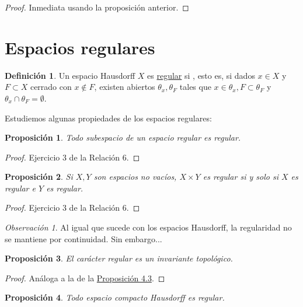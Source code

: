 \documentclass[12pt]{report}
\newtheorem{proposition}{Proposición}[chapter]
\theoremstyle{definition}
\newtheorem{definition}{Definición}[chapter]
\theoremstyle{definition}
\theoremstyle{remark}
\newtheorem*{obs}{Observación} %
\begin{document}
\begin{proof}
Inmediata usando la proposición anterior.
\end{proof}

\section{Espacios regulares}

\begin{definition}
Un espacio Hausdorff $X$ es \underline{regular} si , esto es, si dados $x \in X$ y $F \subset X$ cerrado con $x \notin F$, existen abiertos $\theta_x, \theta_F$ tales que $x \in \theta_x, F \subset \theta_F$ y $\theta_x \cap \theta_F = \emptyset$.
\end{definition}

Estudiemos algunas propiedades de los espacios regulares:

\begin{proposition}
Todo subespacio de un espacio regular es regular.
\end{proposition}

\begin{proof}
Ejercicio 3 de la Relación 6.
\end{proof}

\begin{proposition}
Si $X,Y$ son espacios no vacíos, $X \times Y$ es regular si y solo si $X$ es regular e $Y$ es regular.
\end{proposition}

\begin{proof}
Ejercicio 3 de la Relación 6.
\end{proof}

\begin{obs}
Al igual que sucede con los espacios Hausdorff, la regularidad no se mantiene por continuidad. Sin embargo...
\end{obs}

\begin{proposition}
El carácter regular es un invariante topológico.
\end{proposition}

\begin{proof}
Análoga a la de la \hyperref[prop4.3.]{\color{blue}Proposición 4.3}.
\end{proof}

\begin{proposition}
Todo espacio compacto Hausdorff es regular.
\end{proposition}
\end{document}
